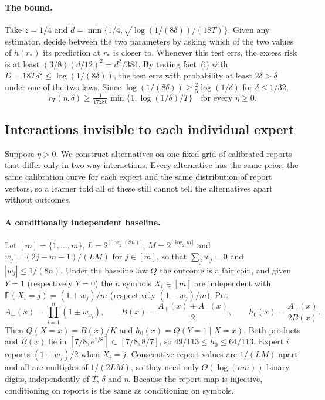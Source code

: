 \documentclass[11pt,a4paper]{article}
\theoremstyle{remark}
\newcommand{\PP}{\mathbb P}
\begin{document}
\paragraph{The bound.} Take $z=1/4$ and $d=\min\{1/4,\sqrt{\log(1/(8\delta))/(18T)}\}$. Given any estimator, decide between the two parameters by asking which of the two values of $h(r_*)$ its prediction at $r_*$ is closer to. Whenever this test errs, the excess risk is at least $(3/8)(d/12)^2=d^2/384$. By testing fact~(i) with $D=18Td^2\le\log(1/(8\delta))$, the test errs with probability at least $2\delta>\delta$ under one of the two laws. Since $\log(1/(8\delta))\ge\frac25\log(1/\delta)$ for $\delta\le1/32$,
\[
 r_T(\eta,\delta)\ge \tfrac{1}{17280}\min\{1,\log(1/\delta)/T\}\quad\text{for every }\eta\ge0 .
\]

\subsection{Interactions invisible to each individual expert}\label{sec:interact}
Suppose $\eta>0$. We construct alternatives on one fixed grid of calibrated reports that differ only in two-way interactions. Every alternative has the same prior, the same calibration curve for each expert and the same distribution of report vectors, so a learner told all of these still cannot tell the alternatives apart without outcomes.

\paragraph{A conditionally independent baseline.} Let $[m]=\{1,\ldots,m\}$, $L=2^{\lceil\log_2(8n)\rceil}$, $M=2^{\lceil\log_2 m\rceil}$ and $w_j=(2j-m-1)/(LM)$ for $j\in[m]$, so that $\sum_jw_j=0$ and $|w_j|\le1/(8n)$. Under the baseline law $Q$ the outcome is a fair coin, and given $Y=1$ (respectively $Y=0$) the $n$ symbols $X_i\in[m]$ are independent with $\PP(X_i=j)=(1+w_j)/m$ (respectively $(1-w_j)/m$). Put
\[
 A_\pm(x)=\prod_{i=1}^n(1\pm w_{x_i}),\qquad
 B(x)=\frac{A_+(x)+A_-(x)}{2},\qquad h_0(x)=\frac{A_+(x)}{2B(x)}.
\]
Then $Q(X=x)=B(x)/K$ and $h_0(x)=Q(Y=1\mid X=x)$. Both products and $B(x)$ lie in $[7/8,e^{1/8}]\subset[7/8,8/7]$, so $49/113\le h_0\le64/113$. Expert $i$ reports $(1+w_j)/2$ when $X_i=j$. Consecutive report values are $1/(LM)$ apart and all are multiples of $1/(2LM)$, so they need only $O(\log(nm))$ binary digits, independently of $T$, $\delta$ and $\eta$. Because the report map is injective, conditioning on reports is the same as conditioning on symbols.
\end{document}
